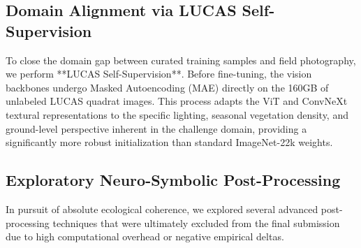 \documentclass[10pt,twocolumn,letterpaper]{article}
\begin{document}
\subsection{Domain Alignment via LUCAS Self-Supervision}
To close the domain gap between curated training samples and field photography, we perform **LUCAS Self-Supervision**. Before fine-tuning, the vision backbones undergo Masked Autoencoding (MAE) directly on the 160GB of unlabeled LUCAS quadrat images. This process adapts the ViT and ConvNeXt textural representations to the specific lighting, seasonal vegetation density, and ground-level perspective inherent in the challenge domain, providing a significantly more robust initialization than standard ImageNet-22k weights.

\subsection{Exploratory Neuro-Symbolic Post-Processing}
In pursuit of absolute ecological coherence, we explored several advanced post-processing techniques that were ultimately excluded from the final submission due to high computational overhead or negative empirical deltas.
\end{document}
